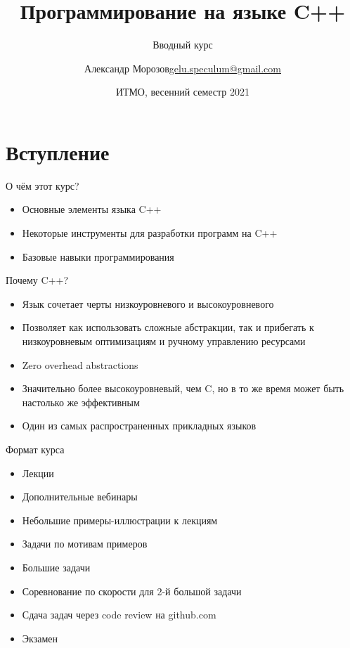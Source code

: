 \documentclass[unknownkeysallowed,xcolor=table]{beamer}
\title[C++]
{Программирование на языке C++}
\subtitle{Вводный курс}
\author[А.~Б.~Морозов]
{
  \texorpdfstring{Александр Морозов\newline\href{mailto:gelu.speculum@gmail.com}{gelu.speculum@gmail.com}}
  {Александр Морозов}
}
\date[ITMO 2021]
{ИТМО, весенний семестр 2021}
\begin{document}
 
\frame{\titlepage}

\section{Вступление}

\begin{frame}{О чём этот курс?}
  \begin{itemize}
    \item Основные элементы языка C++ \vspace{3em}
    \item Некоторые инструменты для разработки программ на C++ \vspace{3em}
    \item Базовые навыки программирования
  \end{itemize}
\end{frame}

\begin{frame}{Почему C++?}
  \begin{itemize}
    \item Язык сочетает черты низкоуровневого и высокоуровневого \vspace{1em}
    \item Позволяет как использовать сложные абстракции, так и прибегать к низкоуровневым оптимизациям и ручному управлению ресурсами \vspace{1em}
    \item Zero overhead abstractions \vspace{1em}
    \item Значительно более высокоуровневый, чем C, но в то же время может быть настолько же эффективным \vspace{1em}
    \item Один из самых распространенных прикладных языков
  \end{itemize}
\end{frame}

\begin{frame}{Формат курса}
  \begin{itemize}
    \item Лекции \vspace{1em}
    \item Дополнительные вебинары \vspace{1em}
    \item Небольшие примеры-иллюстрации к лекциям \vspace{1em}
    \item Задачи по мотивам примеров \vspace{1em}
    \item Большие задачи \vspace{1em}
    \item Соревнование по скорости для 2-й большой задачи \vspace{1em}
    \item Сдача задач через code review на github.com \vspace{1em}
    \item Экзамен
  \end{itemize}
\end{frame}
\end{document}
